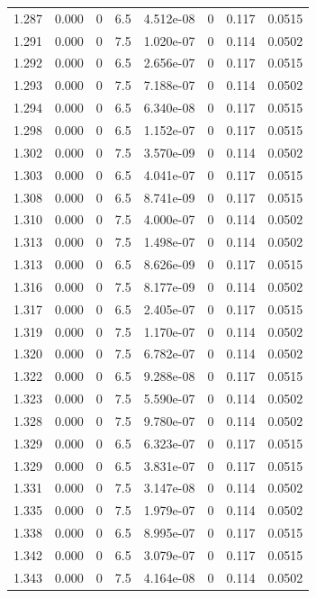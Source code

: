 \documentclass[preview]{standalone}
\begin{document}
{{{{{{{{{{{{{{{\begin{tabular}{L{1.2cm}C{1.2cm} C{0.3cm}C{0.5cm} C{1.4cm}C{1.4cm} C{1.4cm}C{1.4cm}}
  1.287  &  0.000  & 0     & 6.5 &  4.512e-08  & 0  & 0.117 &  0.0515   \\ 
  1.291  &  0.000  & 0     & 7.5 &  1.020e-07  & 0  & 0.114 &  0.0502   \\ 
  1.292  &  0.000  & 0     & 6.5 &  2.656e-07  & 0  & 0.117 &  0.0515   \\ 
  1.293  &  0.000  & 0     & 7.5 &  7.188e-07  & 0  & 0.114 &  0.0502   \\ 
  1.294  &  0.000  & 0     & 6.5 &  6.340e-08  & 0  & 0.117 &  0.0515   \\ 
  1.298  &  0.000  & 0     & 6.5 &  1.152e-07  & 0  & 0.117 &  0.0515   \\ 
  1.302  &  0.000  & 0     & 7.5 &  3.570e-09  & 0  & 0.114 &  0.0502   \\ 
  1.303  &  0.000  & 0     & 6.5 &  4.041e-07  & 0  & 0.117 &  0.0515   \\ 
  1.308  &  0.000  & 0     & 6.5 &  8.741e-09  & 0  & 0.117 &  0.0515   \\ 
  1.310  &  0.000  & 0     & 7.5 &  4.000e-07  & 0  & 0.114 &  0.0502   \\ 
  1.313  &  0.000  & 0     & 7.5 &  1.498e-07  & 0  & 0.114 &  0.0502   \\ 
  1.313  &  0.000  & 0     & 6.5 &  8.626e-09  & 0  & 0.117 &  0.0515   \\ 
  1.316  &  0.000  & 0     & 7.5 &  8.177e-09  & 0  & 0.114 &  0.0502   \\ 
  1.317  &  0.000  & 0     & 6.5 &  2.405e-07  & 0  & 0.117 &  0.0515   \\ 
  1.319  &  0.000  & 0     & 7.5 &  1.170e-07  & 0  & 0.114 &  0.0502   \\ 
  1.320  &  0.000  & 0     & 7.5 &  6.782e-07  & 0  & 0.114 &  0.0502   \\ 
  1.322  &  0.000  & 0     & 6.5 &  9.288e-08  & 0  & 0.117 &  0.0515   \\ 
  1.323  &  0.000  & 0     & 7.5 &  5.590e-07  & 0  & 0.114 &  0.0502   \\ 
  1.328  &  0.000  & 0     & 7.5 &  9.780e-07  & 0  & 0.114 &  0.0502   \\ 
  1.329  &  0.000  & 0     & 6.5 &  6.323e-07  & 0  & 0.117 &  0.0515   \\ 
  1.329  &  0.000  & 0     & 6.5 &  3.831e-07  & 0  & 0.117 &  0.0515   \\ 
  1.331  &  0.000  & 0     & 7.5 &  3.147e-08  & 0  & 0.114 &  0.0502   \\ 
  1.335  &  0.000  & 0     & 7.5 &  1.979e-07  & 0  & 0.114 &  0.0502   \\ 
  1.338  &  0.000  & 0     & 6.5 &  8.995e-07  & 0  & 0.117 &  0.0515   \\ 
  1.342  &  0.000  & 0     & 6.5 &  3.079e-07  & 0  & 0.117 &  0.0515   \\ 
  1.343  &  0.000  & 0     & 7.5 &  4.164e-08  & 0  & 0.114 &  0.0502   \\ 
\hline 
\end{tabular} 

}}}}}}}}}}}}}}}
\end{document}
